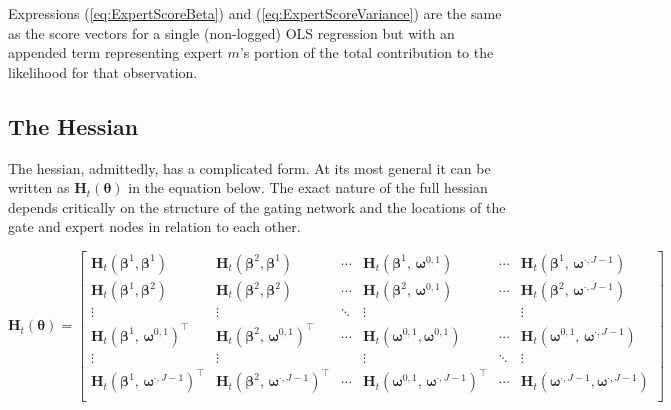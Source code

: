 \documentclass[12pt]{article}
\newcommand{\bw}[1]{\boldsymbol{\omega}^{#1}}
\newcommand{\Ht}[1]{\mathbf{H}_{t}(#1)}
\theoremstyle{definition}
\begin{document}
Expressions (\ref{eq:ExpertScoreBeta}) and (\ref{eq:ExpertScoreVariance}) are the same as the score vectors for a single (non-logged) OLS regression but with an appended term representing expert $m$'s portion of the total contribution to the likelihood for that observation.


\subsection{The Hessian} \label{sec:TheHessian}

The hessian, admittedly, has a complicated form. At its most general it can be written as $\Ht{\boldsymbol{\theta}}$ in the equation below. The exact nature of the full hessian depends critically on the structure of the gating network and the locations of the gate and expert nodes in relation to each other.

\begin{equation} \label{eq:FullHessian}
  \Ht{\boldsymbol{\theta}} =  \begin{bmatrix}
  \Ht{\boldsymbol{\beta}^{1}, \boldsymbol{\beta}^{1}}                       & \Ht{\boldsymbol{\beta}^{2}, \boldsymbol{\beta}^{1}}                      & \cdots & \Ht{ \boldsymbol{\beta}^{1}, \,  \bw{0, 1} }                & \cdots & \Ht{ \boldsymbol{\beta}^{1}, \,  \bw{\boldsymbol{\cdot}, J - 1} }     \\
  \Ht{\boldsymbol{\beta}^{1}, \boldsymbol{\beta}^{2}}                       & \Ht{\boldsymbol{\beta}^{2}, \boldsymbol{\beta}^{2}}                      & \cdots & \Ht{\boldsymbol{\beta}^{2}, \, \bw{0, 1}}                   & \cdots & \Ht{\boldsymbol{\beta}^{2}, \, \bw{\boldsymbol{\cdot}, J - 1}}        \\
  \vdots                                                                    & \vdots                                                                   & \ddots & \vdots                                                      &        & \vdots                                                                \\
  \Ht{ \boldsymbol{\beta}^{1}, \,  \bw{0, 1} }^{\top}                       & \Ht{ \boldsymbol{\beta}^{2}, \,  \bw{0, 1} }^{\top}                      & \cdots & \Ht{\bw{0, 1}, \bw{0, 1}}                                   & \cdots & \Ht{\bw{0, 1}, \, \bw{\boldsymbol{\cdot}, J - 1} }                    \\
  \vdots                                                                    & \vdots                                                                   &        & \vdots                                                      & \ddots & \vdots                                                                \\
  \Ht{ \boldsymbol{\beta}^{1}, \,  \bw{\boldsymbol{\cdot}, J - 1} }^{\top}  & \Ht{ \boldsymbol{\beta}^{2}, \,  \bw{\boldsymbol{\cdot}, J - 1} }^{\top} & \cdots & \Ht{ \bw{0, 1}, \,  \bw{\boldsymbol{\cdot}, J - 1} }^{\top} & \cdots & \Ht{ \bw{\boldsymbol{\cdot}, J - 1}, \bw{\boldsymbol{\cdot}, J - 1}}  \\
    \end{bmatrix}
\end{equation}
\end{document}
